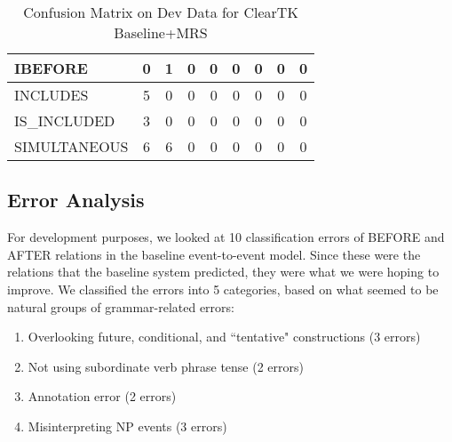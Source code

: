 \documentclass[11pt]{article}
\begin{document}
\begin{table*}[t]
{\begin{tabular}{l|c|c|c|c|c|c|c|c|}
\multicolumn{1}{|l|}{IBEFORE}    & 0                          & 1                           & 0                              & 0                         & 0                             & 0                             & 0                                & 0                                 \\ \hline
\multicolumn{1}{|l|}{INCLUDES}     & 5                          & 0                           & 0                              & 0                         & 0                             & 0                             & 0                                & 0                                 \\ \hline
\multicolumn{1}{|l|}{IS\_INCLUDED} & 3                          & 0                           & 0                              & 0                         & 0                             & 0                             & 0                                & 0                                 \\ \hline
\multicolumn{1}{|l|}{SIMULTANEOUS} & 6                          & 6                           & 0                              & 0                         & 0                             & 0                             & 0                                & 0                                 \\ \hline
\end{tabular}}
\caption{Confusion Matrix on Dev Data for ClearTK Baseline+MRS \label{matrix}}
\end{table*}


\subsection{Error Analysis}

For development purposes, we looked at 10 classification errors of BEFORE and AFTER relations in the baseline event-to-event model. Since these were the relations that the baseline system predicted, they were what we were hoping to improve. We classified the errors into 5 categories, based on what seemed to be natural groups of grammar-related errors:

\begin{enumerate}
\item Overlooking future, conditional, and ``tentative" constructions (3 errors)
\item Not using subordinate verb phrase tense (2 errors)
\item Annotation error (2 errors)
\item Misinterpreting NP events (3 errors)
\end{enumerate}
\end{document}
